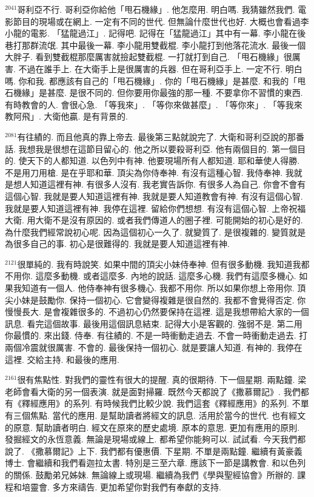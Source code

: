 \documentclass{book}
\begin{document}
$^{2041}$哥利亞不行.
哥利亞你給他「甩石機緣」.
他怎麼用.
明白嗎.
我猜雖然我們.
電影節目的現場或在網上.
一定有不同的世代.
但無論什麼世代也好.
大概也會看過李小龍的電影.
「猛龍過江」.
記得吧.
記得在「猛龍過江」其中有一幕.
李小龍在後巷打那群流氓.
其中最後一幕.
李小龍用雙截棍.
李小龍打到他落花流水.
最後一個大胖子.
看到雙截棍那麼厲害就撿起雙截棍.
一打就打到自己.
「甩石機緣」很厲害.
不過在誰手上.
在大衛手上是很厲害的兵器.
但在哥利亞手上.
一定不行.
明白嗎.
你和我.
都應該有自己的「甩石機緣」.
你的「甩石機緣」是甚麼.
和我的「甩石機緣」是甚麼.
是很不同的.
但你要用你最強的那一種.
不要拿你不習慣的東西.
有時教會的人.
會很心急.
「等我來」.
「等你來做甚麼」.
「等你來」.
「等我來教阿飛」.
大衛他贏.
是有背景的.

$^{2081}$有往績的.
而且他真的靠上帝去.
最後第三點就說完了.
大衛和哥利亞說的那番話.
我想我是很想在這節目留心的.
他之所以要殺哥利亞.
他有兩個目的.
第一個目的.
使天下的人都知道.
以色列中有神.
他要現場所有人都知道.
耶和華使人得勝.
不是用刀用槍.
是在乎耶和華.
頂尖為你侍奉神.
有沒有這種心智.
我侍奉神.
我就是想人知道這裡有神.
有很多人沒有.
我老實告訴你.
有很多人為自己.
你會不會有這個心智.
我就是要人知道這裡有神.
我就是要人知道教會有神.
有沒有這個心智.
我就是要人知道這裡有神.
我停在這裡.
留給你們想想.
有沒有這個心智.
上帝祝福大衛.
用大衛不是沒有原因的.
或者我們傳道人的圈子裡.
可能開始的初心是好的.
為什麼我們經常說初心呢.
因為這個初心一久了.
就變質了.
是很複雜的.
變質就是為很多自己的事.
初心是很難得的.
我就是要人知道這裡有神.

$^{2121}$很單純的.
我有時說笑.
如果中間的頂尖小妹侍奉神.
但有很多動機.
我知道我都不用你.
這麼多動機.
或者這麼多.
內地的說話.
這麼多心機.
我們有這麼多機心.
如果我知道有一個人.
他侍奉神有很多機心.
我都不用你.
所以如果你想上帝用你.
頂尖小妹是鼓勵你.
保持一個初心.
它會變得複雜是很自然的.
我都不會覺得否定.
你慢慢長大.
是會複雜很多的.
不過初心仍然要保持在這裡.
這是我想帶給大家的一個訊息.
看完這個故事.
最後用這個訊息結束.
記得大小是客觀的.
強弱不是.
第二用你最慣的.
來出錢.
侍奉.
有往績的.
不是一時衝動走過去.
不會一時衝動走過去.
打兩個冷震就很厲害.
不會的.
最後保持一個初心.
就是要讓人知道.
有神的.
我停在這裡.
交給主持.
和最後的應用.

$^{2161}$很有焦點性.
對我們的靈性有很大的提醒.
真的很期待.
下一個星期.
兩點鐘.
梁老師會看大衛的另一個表演.
就是面對掃羅.
既然今天都說了《撒慕爾記》.
我們都有《釋經應用》的系列.
有時候我們比較少說.
我們這套《釋經應用》的系列.
不單有三個焦點.
當代的應用.
是幫助讀者將經文的訊息.
活用於當今的世代.
也有經文的原意.
幫助讀者明白.
經文在原來的歷史處境.
原本的意思.
更加有應用的原則.
發掘經文的永恆意義.
無論是現場或線上.
都希望你能夠可以.
試試看.
今天我們都說了.
《撒慕爾記》上下.
我們都有優惠價.
下星期.
不單是兩點鐘.
繼續有黃豪義博士.
會繼續和我們看迦拉太書.
特別是三至六章.
應該下一節是講教會.
和以色列的關係.
鼓勵弟兄姊妹.
無論線上或現場.
繼續為我們《學與聖經協會》所辦的.
課程和培靈會.
多方來禱告.
更加希望你對我們有奉獻的支持.
\end{document}
